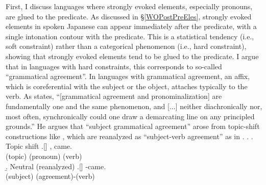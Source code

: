 First, I discuss languages where strongly evoked elements, especially pronouns, are glued to the predicate.
As discussed in \S \ref{WOPostPreEles},
strongly evoked elements in spoken Japanese can appear immediately after the predicate, with a single intonation contour with the predicate.
This is a statistical tendency (i.e., soft constraint) rather than a categorical phenomenon (i.e., hard constraint),
showing that strongly evoked elements tend to be glued to the predicate.
I argue that in languages with hard constraints,
this corresponds to so-called ``grammatical agreement''.
In languages with grammatical agreement,
an affix, which is coreferential with the subject or the object,
attaches typically to the verb.
As  states,
``[grammatical agreement and pronominalization] are fundamentally one and the same phenomenon, and [...] neither diachronically nor, most often, synchronically could one draw a demarcating line on any principled grounds.''
He argues that ``subject grammatical agreement'' arose from topic-shift constructions like \Next[a],
which are reanalyzed as ``subject-verb agreement'' as in \Next[b].
%
\ex.\label{Disc:HardConst:Integrated:Ex:TS}
 \a. Topic shift
 \bg.[] ,  came. \\
        (topic) (pronoun) (verb) \\
 \b. Neutral (reanalyzed)
 \bg.[]  -came. \\
        (subject) (agreement)-(verb) \\
 \hfill{\cite[155]{givon76}}

